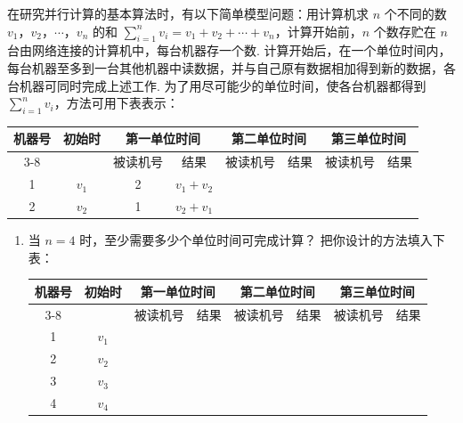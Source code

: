 \begin{problem}
在研究并行计算的基本算法时，有以下简单模型问题：用计算机求 \(n\) 个不同的数 \(v_1\)，\(v_2\)，\(\cdots\)，\(v_n\) 的和 \(\sum_{i=1}^{n}v_i=v_1+v_2+\cdots+v_n\)，计算开始前，\(n\) 个数存贮在 \(n\) 台由网络连接的计算机中，每台机器存一个数. 计算开始后，在一个单位时间内，每台机器至多到一台其他机器中读数据，并与自己原有数据相加得到新的数据，各台机器可同时完成上述工作. 为了用尽可能少的单位时间，使各台机器都得到 \(\sum_{i=1}^{n}v_i\)，方法可用下表表示：

\begin{center}
\begingroup
\setlength{\tabcolsep}{4pt}
\renewcommand{\arraystretch}{1.15}
\begin{tabular}{|c|c|cc|cc|cc|}
\hline
\multirow{2}{*}{机器号} & \multirow{2}{*}{初始时} & \multicolumn{2}{c|}{第一单位时间} & \multicolumn{2}{c|}{第二单位时间} & \multicolumn{2}{c|}{第三单位时间} \\
\cline{3-8}
 & & 被读机号 & 结果 & 被读机号 & 结果 & 被读机号 & 结果 \\
\hline
1 & \(v_1\) & 2 & \(v_1+v_2\) &  &  &  &  \\
\hline
2 & \(v_2\) & 1 & \(v_2+v_1\) &  &  &  &  \\
\hline
\end{tabular}
\endgroup
\end{center}

\begin{enumerate}
\item 当 \(n=4\) 时，至少需要多少个单位时间可完成计算？ 把你设计的方法填入下表：

\begin{center}
\begingroup
\setlength{\tabcolsep}{4pt}
\renewcommand{\arraystretch}{1.15}
\begin{tabular}{|c|c|cc|cc|cc|}
\hline
\multirow{2}{*}{机器号} & \multirow{2}{*}{初始时} & \multicolumn{2}{c|}{第一单位时间} & \multicolumn{2}{c|}{第二单位时间} & \multicolumn{2}{c|}{第三单位时间} \\
\cline{3-8}
 & & 被读机号 & 结果 & 被读机号 & 结果 & 被读机号 & 结果 \\
\hline
1 & \(v_1\) &  &  &  &  &  &  \\
\hline
2 & \(v_2\) &  &  &  &  &  &  \\
\hline
3 & \(v_3\) &  &  &  &  &  &  \\
\hline
4 & \(v_4\) &  &  &  &  &  &  \\
\hline
\end{tabular}
\endgroup
\end{center}


\end{enumerate}
\end{problem}
